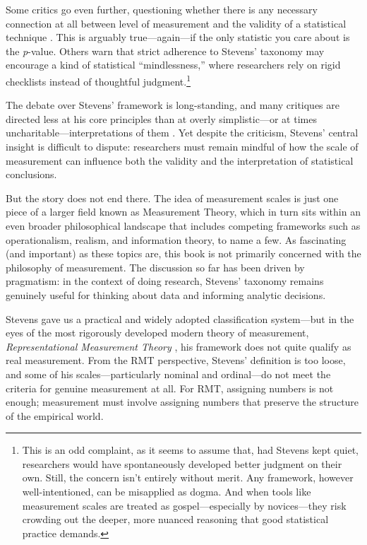 Some critics go even further, questioning whether there is any necessary connection at all between level of measurement and the validity of a statistical technique \parencite{Gaito1980}. This is arguably true—again—if the only statistic you care about is the \textit{p}-value. Others warn that strict adherence to Stevens’ taxonomy may encourage a kind of statistical ``mindlessness,'' where researchers rely on rigid checklists instead of thoughtful judgment.\footnote{This is an odd complaint, as it seems to assume that, had Stevens kept quiet, researchers would have spontaneously developed better judgment on their own. Still, the concern isn’t entirely without merit. Any framework, however well-intentioned, can be misapplied as dogma. And when tools like measurement scales are treated as gospel—especially by novices—they risk crowding out the deeper, more nuanced reasoning that good statistical practice demands.}

The debate over Stevens’ framework is long-standing, and many critiques are directed less at his core principles than at overly simplistic—or at times uncharitable—interpretations of them \parencite[see][for a summary]{ZandScholten2009}. Yet despite the criticism, Stevens’ central insight is difficult to dispute: researchers must remain mindful of how the scale of measurement can influence both the validity and the interpretation of statistical conclusions.

But the story does not end there. The idea of measurement scales is just one piece of a larger field known as Measurement Theory, which in turn sits within an even broader philosophical landscape that includes competing frameworks such as operationalism, realism, and information theory, to name a few. As fascinating (and important) as these topics are, this book is not primarily concerned with the philosophy of measurement. The discussion so far has been driven by pragmatism: in the context of doing research, Stevens’ taxonomy remains genuinely useful for thinking about data and informing analytic decisions.

Stevens gave us a practical and widely adopted classification system—but in the eyes of the most rigorously developed modern theory of measurement, \textit{Representational Measurement Theory} \parencite[RMT;][]{Luce2001}, his framework does not quite qualify as real measurement. From the RMT perspective, Stevens’ definition is too loose, and some of his scales—particularly nominal and ordinal—do not meet the criteria for genuine measurement at all. For RMT, assigning numbers is not enough; measurement must involve assigning numbers that preserve the structure of the empirical world.

